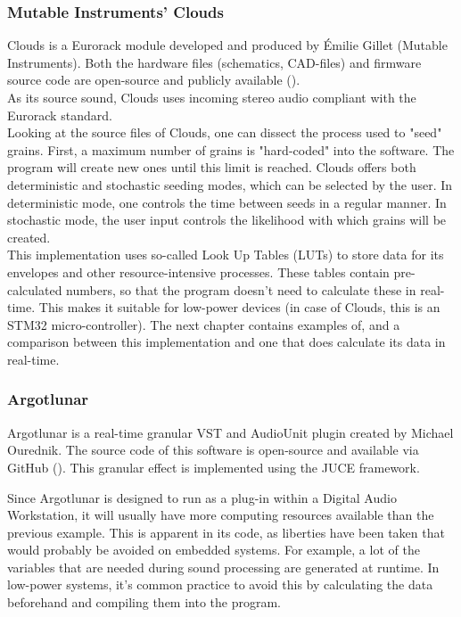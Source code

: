 \documentclass[10pt, twocolumn]{IEEEtran}
\begin{document}
\subsubsection{Mutable Instruments' Clouds}
Clouds is a Eurorack module developed and produced by Émilie Gillet (Mutable Instruments). Both the hardware files (schematics, CAD-files) and firmware source code are open-source and publicly available (\cite{clouds}).\\
As its source sound, Clouds uses incoming stereo audio compliant with the Eurorack standard.\\
Looking at the source files of Clouds, one can dissect the process used to "seed" grains. First, a maximum number of grains is "hard-coded" into the software. The program will create new ones until this limit is reached. Clouds offers both deterministic and stochastic seeding modes, which can be selected by the user. In deterministic mode, one controls the time between seeds in a regular manner. In stochastic mode, the user input controls the likelihood with which grains will be created.\\
This implementation uses so-called Look Up Tables (LUTs) to store data for its envelopes and other resource-intensive processes. These tables contain pre-calculated numbers, so that the program doesn't need to calculate these in real-time. This makes it suitable for low-power devices (in case of Clouds, this is an STM32 micro-controller). The next chapter contains examples of, and a comparison between this implementation and one that does calculate its data in real-time.\\

\subsubsection{Argotlunar}
Argotlunar is a real-time granular VST and AudioUnit plugin created by Michael Ourednik. The source code of this software is open-source and available via GitHub (\cite{argotlunar}). This granular effect is implemented using the JUCE framework.

Since Argotlunar is designed to run as a plug-in within a Digital Audio Workstation, it will usually have more computing resources available than the previous example. This is apparent in its code, as liberties have been taken that would probably be avoided on embedded systems. For example, a lot of the variables that are needed during sound processing are generated at runtime. In low-power systems, it's common practice to avoid this by calculating the data beforehand and compiling them into the program.
\end{document}
